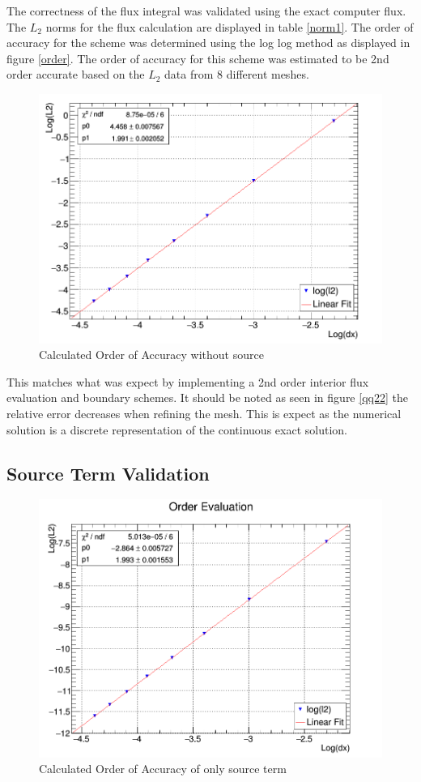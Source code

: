 \documentclass[paper=a4, fontsize=11pt, abstract=on]{scrartcl}
\numberwithin{equation}{section}		%
\numberwithin{figure}{section}			%
\numberwithin{table}{section}				%
\begin{document}
The correctness of the flux integral was validated using the exact computer flux. The $L_2$ norms for the flux calculation are displayed in table \ref{norm1}. The order of accuracy for the scheme was determined using the log log method as displayed in figure \ref{order}. The order of accuracy for this scheme was estimated to be 2nd order accurate based on the $L_2$ data from 8 different meshes.     
    
  

\begin{figure}[H]
\centering
\includegraphics[width=0.85\linewidth]{order}
\caption{Calculated Order of Accuracy without source}
\label{ord}
\end{figure}


This matches what was expect by implementing a 2nd order interior flux evaluation and boundary schemes. It should be noted as seen in figure \ref{qq22} the relative error decreases when refining the mesh. This is expect as the numerical solution is a discrete representation of the continuous exact solution. 

 




\subsection{Source Term Validation}

\begin{figure}[H]
\centering
\includegraphics[width=0.85\linewidth]{source}
\caption{Calculated Order of Accuracy of only source term}
\label{ord}
\end{figure}
\end{document}
